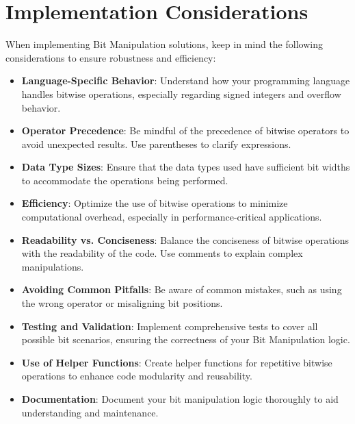 \section*{Implementation Considerations}

When implementing Bit Manipulation solutions, keep in mind the following considerations to ensure robustness and efficiency:

\begin{itemize}
    \item \textbf{Language-Specific Behavior}: Understand how your programming language handles bitwise operations, especially regarding signed integers and overflow behavior.
    
    \item \textbf{Operator Precedence}: Be mindful of the precedence of bitwise operators to avoid unexpected results. Use parentheses to clarify expressions.
    
    \item \textbf{Data Type Sizes}: Ensure that the data types used have sufficient bit widths to accommodate the operations being performed.
    
    \item \textbf{Efficiency}: Optimize the use of bitwise operations to minimize computational overhead, especially in performance-critical applications.
    
    \item \textbf{Readability vs. Conciseness}: Balance the conciseness of bitwise operations with the readability of the code. Use comments to explain complex manipulations.
    
    \item \textbf{Avoiding Common Pitfalls}: Be aware of common mistakes, such as using the wrong operator or misaligning bit positions.
    
    \item \textbf{Testing and Validation}: Implement comprehensive tests to cover all possible bit scenarios, ensuring the correctness of your Bit Manipulation logic.
    
    \item \textbf{Use of Helper Functions}: Create helper functions for repetitive bitwise operations to enhance code modularity and reusability.
    
    \item \textbf{Documentation}: Document your bit manipulation logic thoroughly to aid understanding and maintenance.
\end{itemize}

